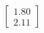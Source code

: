 \documentclass[preview]{standalone}
\begin{document}
\begin{align*}
\begin{bmatrix} 1.80 \\ 2.11 \end{bmatrix}
\end{align*}
\end{document}
